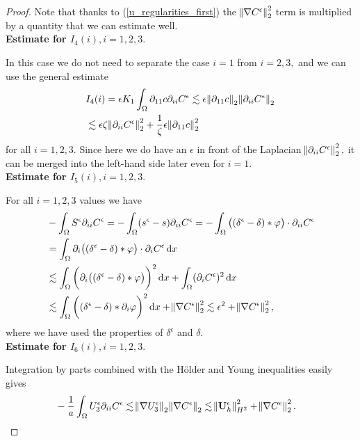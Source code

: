 \documentclass[11pt, a4paper]{article}
\newcommand*\diff{\mathop{}\!\mathrm{d}}
\begin{document}
\begin{proof}
Note that thanks to (\ref{u_regularities_first}) the $\norm{\nabla C^\epsilon}_2^2$ term is multiplied by a quantity that we can estimate well.\\[0.5cm]
\textbf{Estimate for $I_4(i), i = 1,2,3.$}

In this case we do not need to separate the case $i=1$ from $i=2,3,$ and we can use the general estimate
%
\begin{equation}
\begin{split}
& I_4(i) = \epsilon K_1 \int_\Omega \partial_{11} c \partial_{ii} C^\epsilon \lesssim \epsilon \norm{\partial_{11} c}_2 \norm{\partial_{ii} C^\epsilon}_2 \\
& \lesssim \epsilon \zeta \norm{\partial_{ii} C^\epsilon}_2^2 + \frac{1}{\zeta}\epsilon \norm{\partial_{11} c}_2^2
\end{split}
\end{equation}
%
for all $i =1,2,3.$ Since here we do have an $\epsilon$ in front of the Laplacian $ \norm{\partial_{ii} C^\epsilon}_2^2,$ it can be merged into the left-hand side later even for $i = 1.$\\[0.5cm]
\textbf{Estimate for $I_5 (i), i = 1,2,3.$}

For all $i = 1,2,3$ values we have
%
\begin{equation}
\begin{split}
& - \int_\Omega S^\epsilon \partial_{ii} C^\epsilon = - \int_\Omega (s^\epsilon - s) \partial_{ii} C^\epsilon = - \int_\Omega \big ( (\delta^\epsilon - \delta ) \ast \varphi \big ) \cdot \partial_{ii} C^\epsilon \\
& = \int_\Omega \partial_i \big ( (\delta^\epsilon - \delta ) \ast \varphi \big ) \cdot \partial_i C^\epsilon \diff x \\
& \lesssim \int_\Omega \bigg( \partial_i \big ( (\delta^\epsilon - \delta ) \ast \varphi \big ) \bigg ) ^2 \diff x + \int_\Omega (\partial_i C^\epsilon)^2 \diff x \\
& \lesssim \int_\Omega \bigg ( (\delta^\epsilon - \delta ) \ast \partial_i \varphi \bigg ) ^2 \diff x + \norm{\nabla C^\epsilon}_2^2 \lesssim \epsilon^2 + \norm{\nabla C^\epsilon}_2^2,
\end{split}
\end{equation}
%
where we have used the properties of $\delta^\epsilon$ and $\delta.$\\[0.5cm]
\textbf{Estimate for $I_6 (i), i = 1,2,3.$}

Integration by parts combined with the H\"older and Young inequalities easily gives
%
\begin{equation}
\begin{split}
& - \frac{1}{a} \int_\Omega U_3^\epsilon \partial_{ii} C^\epsilon \lesssim \norm{\nabla U_3^\epsilon}_2 \norm{\nabla C^\epsilon}_2 \lesssim \norm{\mathbf{U}_h^\epsilon}_{H^2}^2 + \norm{\nabla C^\epsilon}_2^2.
\end{split}
\end{equation}


\end{proof}
\end{document}

